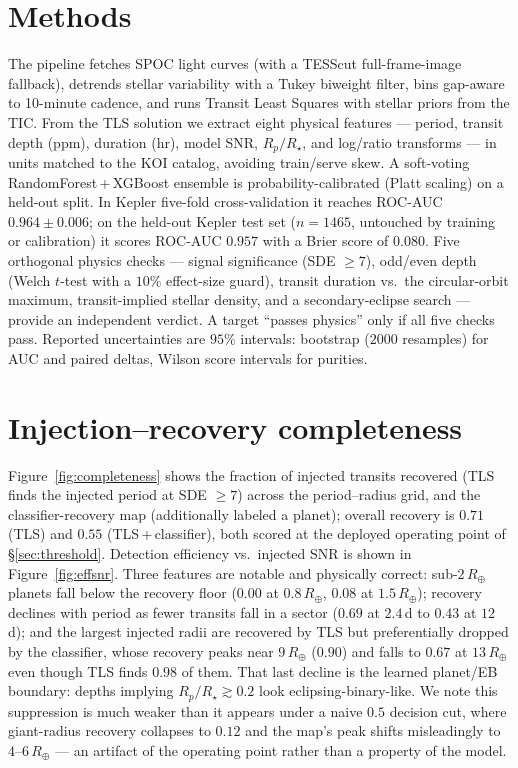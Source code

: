 \documentclass[11pt]{article}
\begin{document}
\section{Methods}
The pipeline fetches SPOC light curves (with a TESScut
full-frame-image fallback), detrends stellar variability with a Tukey biweight
filter, bins gap-aware to 10-minute cadence, and runs Transit Least Squares
\cite{hippke2019tls} with stellar priors from the TIC. From the TLS solution we
extract eight physical features --- period, transit depth (ppm), duration (hr),
model SNR, $R_p/R_\star$, and log/ratio transforms --- in units matched to the KOI
catalog, avoiding train/serve skew. A soft-voting RandomForest\,+\,XGBoost
ensemble is probability-calibrated (Platt scaling) on a held-out split. In Kepler
five-fold cross-validation it reaches ROC-AUC $0.964\pm0.006$; on the held-out
Kepler test set ($n=1465$, untouched by training or calibration) it scores
ROC-AUC $0.957$ with a Brier score of $0.080$.
Five orthogonal physics checks --- signal significance (SDE $\geq 7$), odd/even
depth (Welch $t$-test with a $10\%$ effect-size guard), transit duration vs.\
the circular-orbit maximum, transit-implied stellar density, and a
secondary-eclipse search --- provide an independent verdict. A target ``passes
physics'' only if all five checks pass. Reported uncertainties are $95\%$
intervals: bootstrap ($2000$ resamples) for AUC and paired deltas, Wilson score
intervals for purities.

\section{Injection--recovery completeness}
Figure~\ref{fig:completeness} shows the fraction of injected transits recovered
(TLS finds the injected period at SDE $\geq 7$) across the period--radius grid,
and the classifier-recovery map (additionally labeled a planet); overall recovery
is $0.71$ (TLS) and $0.55$ (TLS\,+\,classifier), both scored at the deployed
operating point of \S\ref{sec:threshold}. Detection efficiency vs.\ injected SNR
is shown in Figure~\ref{fig:effsnr}. Three features are notable and physically
correct: sub-$2\,R_\oplus$ planets fall below the recovery floor ($0.00$ at
$0.8\,R_\oplus$, $0.08$ at $1.5\,R_\oplus$); recovery declines with period as
fewer transits fall in a sector ($0.69$ at $2.4$\,d to $0.43$ at $12$\,d); and
the largest injected radii are recovered by TLS but preferentially dropped by the
classifier, whose recovery peaks near $9\,R_\oplus$ ($0.90$) and falls to $0.67$
at $13\,R_\oplus$ even though TLS finds $0.98$ of them. That last decline is the
learned planet/EB boundary: depths implying $R_p/R_\star \gtrsim 0.2$ look
eclipsing-binary-like. We note this suppression is much weaker than it appears
under a naive $0.5$ decision cut, where giant-radius recovery collapses to $0.12$
and the map's peak shifts misleadingly to $4$--$6\,R_\oplus$ --- an artifact of
the operating point rather than a property of the model.
\end{document}

